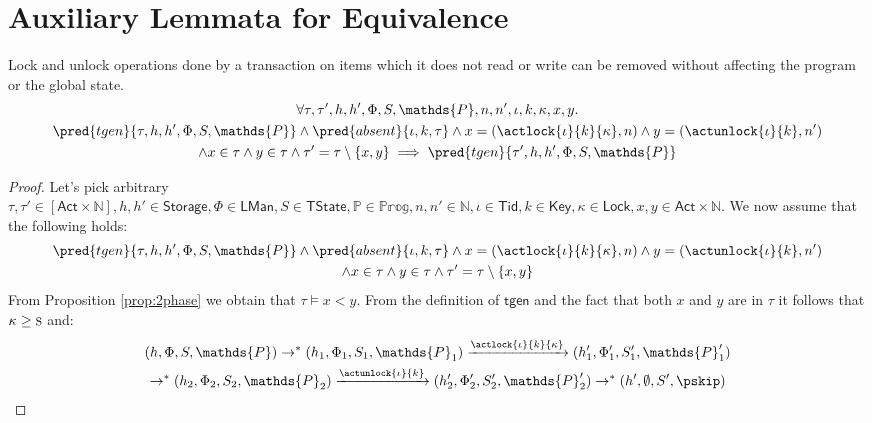 \section{Auxiliary Lemmata for Equivalence}

\begin{lem}
	\label{lem:lockAbsent}
	Lock and unlock operations done by a transaction on items which it does not read or write can be removed without affecting the program or the global state.
	\begin{gather*}
		\forall \tau, \tau', h, h', \Phi, S, \mathds{P}, n, n', \iota, k, \kappa, x, y \ldotp
			\\
		\pred{tgen}{\tau, h, h', \Phi, S, \mathds{P}} \land  \pred{absent}{\iota, k, \tau} \land x = (\actlock{\iota}{k}{\kappa}, n) \land y = (\actunlock{\iota}{k}, n') \\ \land x \in \tau \land y \in \tau
		\land \tau' = \tau \setminus \{ x, y \}
			\implies
		\pred{tgen}{\tau', h, h', \Phi, S, \mathds{P}}
	\end{gather*}
	\begin{proof}
	Let's pick arbitrary $\tau, \tau' \in [\mathsf{Act} \times \mathds{N}], h, h' \in \mathsf{Storage}, \Phi \in \mathsf{LMan}, S \in \mathsf{TState}, \mathds{P} \in \mathds{Prog}, n, n' \in \mathds{N}, \iota \in \mathsf{Tid}, k \in \mathsf{Key}, \kappa \in \mathsf{Lock}, x, y \in \mathsf{Act} \times \mathds{N}$. We now assume that the following holds:
	\begin{gather*}
		\pred{tgen}{\tau, h, h', \Phi, S, \mathds{P}} \land  \pred{absent}{\iota, k, \tau} \land x = (\actlock{\iota}{k}{\kappa}, n) \land y = (\actunlock{\iota}{k}, n') \\ \land x \in \tau \land y \in \tau
		\land \tau' = \tau \setminus \{ x, y \}
	\end{gather*}
	From Proposition \ref{prop:2phase} we obtain that $\tau \vDash x < y$. From the definition of $\mathsf{tgen}$ and the fact that both $x$ and $y$ are in $\tau$ it follows that $\kappa \geq \textsc{s}$ and:
	\begin{gather}
		(h, \Phi, S, \mathds{P}) \rightarrow^* (h_1, \Phi_1, S_1, \mathds{P}_1) \xrightarrow{\actlock{\iota}{k}{\kappa}} (h_1', \Phi_1', S_1', \mathds{P}_1') \\ \rightarrow^* (h_2, \Phi_2, S_2, \mathds{P}_2) \xrightarrow{\actunlock{\iota}{k}} (h_2', \Phi_2', S_2', \mathds{P}_2') \rightarrow^* (h', \emptyset, S', \pskip)
	\end{gather}

\end{proof}
\end{lem}
